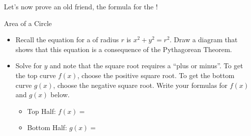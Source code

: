 Let's now prove an old friend, the formula for the  !
\begin{exercise}{Area of a Circle \Coffeecup \Coffeecup }
\begin{itemize}
\item Recall the equation for a  of radius $r$ is $x^2+y^2=r^2$. Draw a diagram that shows that this equation is a consequence of the Pythagorean Theorem.  


\item Solve for $y$ and note that the square root requires a ``plus or minus''.  To get the top curve $f(x)$, choose the positive square root.  To get the bottom curve $g(x)$, choose the negative square root.  Write your formulas for $f(x)$ and $g(x)$ below. \vspace*{.1in}
\begin{itemize}
\item Top Half: $f(x) = $
\vspace*{.1in}
\item Bottom Half: $g(x) = $
\vspace*{.1in}
\end{itemize}


\end{itemize}
\end{exercise}
